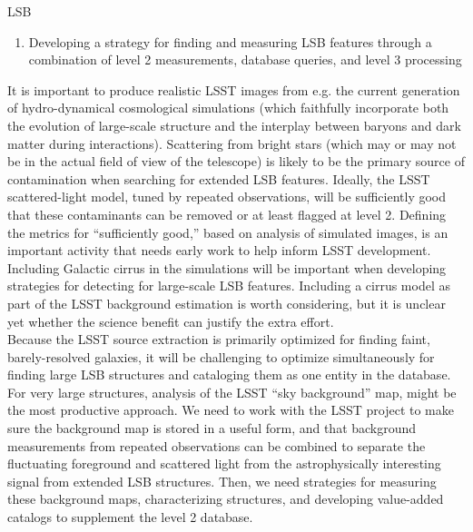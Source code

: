 \begin{tasklist}{LSB}
\begin{task}
{\begin{enumerate}
\item Developing a strategy for finding and measuring  LSB features  through  a combination of level 2 measurements, database queries, and level 3 processing
\end{enumerate}
It is important to produce realistic LSST images from e.g. the current generation of hydro-dynamical cosmological simulations (which faithfully incorporate both the evolution of large-scale structure and the interplay between baryons and dark matter during interactions). Scattering from bright stars (which may or may not be in the actual field of view of the  telescope) is likely to be the  primary source of contamination when searching  for extended  LSB features. Ideally,  the  LSST scattered-light model, tuned  by  repeated   observations, will be  sufficiently  good that these contaminants can be removed  or at  least flagged at  level 2.  Defining the metrics for “sufficiently good,” based on analysis of simulated images, is an important activity that needs early  work to  help inform  LSST development.
\\
Including  Galactic  cirrus  in the simulations will be important when developing strategies for detecting for large-scale  LSB features.   Including  a cirrus  model as part  of the  LSST background  estimation is worth  considering,  but  it is unclear  yet whether  the science benefit can justify the extra  effort.
\\
Because  the  LSST  source  extraction is primarily  optimized  for finding  faint,  barely-resolved  galaxies,  it  will  be challenging  to  optimize  simultaneously for finding large LSB structures and cataloging  them  as one entity  in the database. For very large structures, analysis of the LSST “sky background” map, might be the most productive approach. We need to work with the LSST project to make sure the background  map is stored in a useful form, and that background  measurements from repeated  observations can  be combined  to separate  the  fluctuating foreground  and  scattered light from the astrophysically interesting signal from extended  LSB structures. Then, we need strategies for measuring these background  maps,  characterizing structures,  and  developing value-added  catalogs  to supplement the level 2 database.
\\
}
\end{task}
\end{tasklist}
